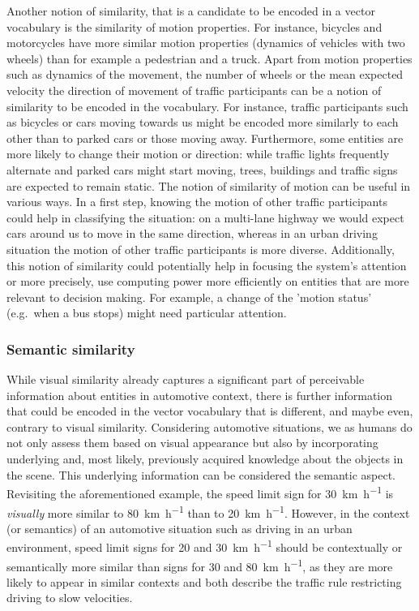 Another notion of similarity, that is a candidate to be encoded in a vector vocabulary is the similarity of motion properties.
For instance, bicycles and motorcycles have more similar motion properties (dynamics of vehicles with two wheels) than for example a pedestrian and a truck.
Apart from motion properties such as dynamics of the movement, the number of wheels or the mean expected velocity the direction of movement of traffic participants can be a notion of similarity to be encoded in the vocabulary.
For instance, traffic participants such as bicycles or cars moving towards us might be encoded more similarly to each other than to parked cars or those moving away.
Furthermore, some entities are more likely to change their motion or direction: while traffic lights frequently alternate and parked cars might start moving, trees, buildings and traffic signs are expected to remain static. 
The notion of similarity of motion can be useful in various ways.
In a first step, knowing the motion of other traffic participants could help in classifying the situation: on a multi-lane highway we would expect cars around us to move in the same direction, whereas in an urban driving situation the motion of other traffic participants is more diverse. 
Additionally, this notion of similarity could potentially help in focusing the system's attention or more precisely, use computing power more efficiently on entities that are more relevant to decision making.
For example, a change of the 'motion status' (e.g.\ when a bus stops) might need particular attention.

\subsubsection{Semantic similarity}%
\label{ssubsec:semantic_similarity}

While visual similarity already captures a significant part of perceivable information about entities in automotive context, there is further information that could be encoded in the vector vocabulary that is different, and maybe even, contrary to visual similarity. 
Considering automotive situations, we as humans do not only assess them based on visual appearance but also by incorporating underlying and, most likely, previously acquired knowledge about the objects in the scene.
This underlying information can be considered the semantic aspect.
Revisiting the aforementioned example, the speed limit sign for \SI[per-mode=symbol]{30}{\kilo\meter\per\hour} is \emph{visually} more similar to \SI[per-mode=symbol]{80}{\kilo\meter\per\hour} than to \SI[per-mode=symbol]{20}{\kilo\meter\per\hour}.
However, in the context (or semantics) of an automotive situation such as driving in an urban environment, speed limit signs for \num{20} and \SI[per-mode=symbol]{30}{\kilo\meter\per\hour} should be contextually or semantically more similar than signs for \num{30} and \SI[per-mode=symbol]{80}{\kilo\meter\per\hour}, as they are more likely to appear in similar contexts and both describe the traffic rule restricting driving to slow velocities.

